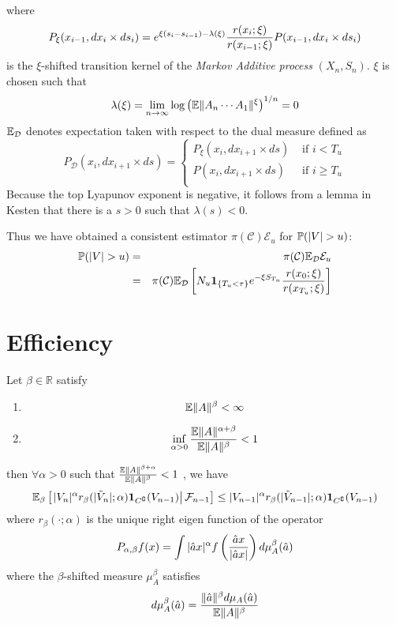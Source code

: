 \documentclass{article}
\begin{document}
where
\[
P_\xi(x_{i-1}, dx_i \times ds_i) = e^{\xi(s_i - s_{i-1}) -
  \lambda(\xi)} {r(x_i; \xi) \over r(x_{i-1}; \xi)} P(x_{i-1}, dx_i
\times ds_i)
\]
is the $\xi$-shifted transition kernel of the {\it Markov Additive
  process} $(X_n, S_n)$. $\xi$ is chosen such that 
\[
\lambda(\xi) = \lim_{n \to \infty} \log \left(
\E \|A_n \cdots A_1\|^\xi
\right)^{1/n} = 0
\]
$\E_{\mathcal D}$ denotes expectation taken with respect to the dual
measure defined as
\[
P_{\mathcal D} (x_i, dx_{i+1} \times ds) = \left\{
  \begin{array}{ll}
    P_\xi (x_i, dx_{i+1} \times ds) & \text{ if } i < T_u \\
    P(x_i, dx_{i+1} \times ds) & \text{ if } i \geq T_u \\
  \end{array}
\right.
\]
Because the top Lyapunov exponent is negative, it follows from a lemma
in Kesten \cite{Kesten1973} that there is a $s > 0$ such that
$\lambda(s) < 0$.

Thus we have obtained a consistent estimator
$\pi(\mathcal C)\mathcal E_u$ for $\P(|V| > u)$:
\begin{eqnarray*}
\P(|V| > u) &=& \pi(\mathcal C) \E_{\mathcal D} \mathcal E_u \\
&=& \pi(\mathcal C) \E_{\mathcal D} \left[
  N_u \1{T_u < \tau} e^{-\xi S_{T_u}} {r(x_0; \xi)
    \over r(x_{T_u}; \xi)}
\right]
\end{eqnarray*}

\section{Efficiency}\label{sec:efficiency}
\begin{lemma}
  Let $\beta \in \mathbb R$ satisfy
  \begin{enumerate}
  \item
    \begin{equation}
      \label{eq:drift_cond1}
      \E \|A\|^\beta < \infty      
    \end{equation}
  \item 
    \begin{equation}
      \label{eq:drift_cond2}
    \inf_{\alpha > 0} {\E \|A\|^{\alpha + \beta}
      \over 
      \E \|A\|^{\beta}
    } < 1
    \end{equation}
  \end{enumerate}
  then $\forall \alpha > 0$ such that $\frac{\E\|A\|^{\beta +
      \alpha}}{\E\|A\|^\beta} < 1$ , we have
  \begin{equation}
    \label{eq:drift}
    \E_\beta \left[\left.
        |V_n|^\alpha r_\beta(|\tilde V_n|; \alpha) \I{C^\complement}(V_{n-1}) \right|
      \mathcal F_{n-1} \right] \leq |V_{n-1}|^\alpha r_\beta(|\tilde
    V_{n-1}|; \alpha) \I{C^\complement}(V_{n-1})
  \end{equation}
  where $r_\beta(\cdot; \alpha)$ is the unique right eigen function of the
  operator
  \[
  P_{\alpha, \beta} f(x) = \int |\hat a x|^\alpha f\left(
    {\hat a x \over |\hat a x|}
  \right) d\mu_A^\beta(\hat a)
  \]
  where the $\beta$-shifted measure $\mu_A^\beta$ satisfies
  \[
  d\mu_A^\beta(\hat a) = {\|\hat a\|^\beta d\mu_A(\hat a) \over \E\|A\|^\beta}
  \]
\end{lemma}
\end{document}
